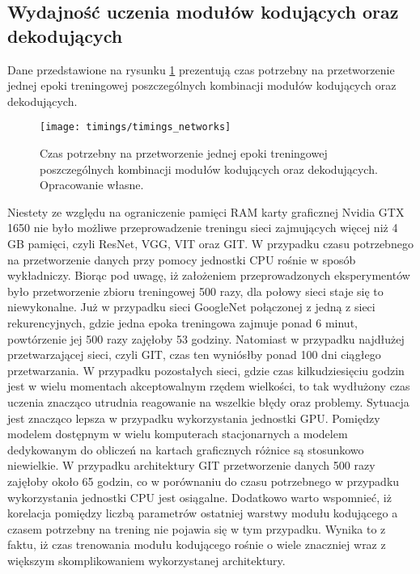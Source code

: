\subsection{Wydajność uczenia modułów kodujących oraz dekodujących}
Dane przedstawione na rysunku \ref{fig:timings-networks} prezentują czas potrzebny na przetworzenie jednej epoki treningowej poszczególnych kombinacji modułów kodujących oraz dekodujących.
\begin{figure}[H]
    \centering
    \texttt{[image: timings/timings\_networks]}
    \caption{Czas potrzebny na przetworzenie jednej epoki treningowej poszczególnych kombinacji modułów kodujących oraz dekodujących. Opracowanie własne.}
    \label{fig:timings-networks}
\end{figure}
\noindent Niestety ze względu na ograniczenie pamięci RAM karty graficznej Nvidia GTX 1650 nie było możliwe przeprowadzenie treningu sieci zajmujących więcej niż 4 GB pamięci, czyli ResNet, VGG, VIT oraz GIT. W przypadku czasu potrzebnego na przetworzenie danych przy pomocy jednostki CPU rośnie w sposób wykładniczy. Biorąc pod uwagę, iż założeniem przeprowadzonych eksperymentów było przetworzenie zbioru treningowej 500 razy, dla połowy sieci staje się to niewykonalne. Już w przypadku sieci GoogleNet połączonej z jedną z sieci rekurencyjnych, gdzie jedna epoka treningowa zajmuje ponad 6 minut, powtórzenie jej 500 razy zajęłoby 53 godziny. Natomiast w przypadku najdłużej przetwarzającej sieci, czyli GIT, czas ten wyniósłby ponad 100 dni ciągłego przetwarzania. W przypadku pozostałych sieci, gdzie czas kilkudziesięciu godzin jest w wielu momentach akceptowalnym rzędem wielkości, to tak wydłużony czas uczenia znacząco utrudnia reagowanie na wszelkie błędy oraz problemy. Sytuacja jest znacząco lepsza w przypadku wykorzystania jednostki GPU. Pomiędzy modelem dostępnym w wielu komputerach stacjonarnych a modelem dedykowanym do obliczeń na kartach graficznych różnice są stosunkowo niewielkie. W przypadku architektury GIT przetworzenie danych 500 razy zajęłoby około 65 godzin, co w porównaniu do czasu potrzebnego w przypadku wykorzystania jednostki CPU jest osiągalne. Dodatkowo warto wspomnieć, iż korelacja pomiędzy liczbą parametrów ostatniej warstwy modułu kodującego a czasem potrzebny na trening nie pojawia się w tym przypadku. Wynika to z faktu, iż czas trenowania modułu kodującego rośnie o wiele znaczniej wraz z większym skomplikowaniem wykorzystanej architektury.

